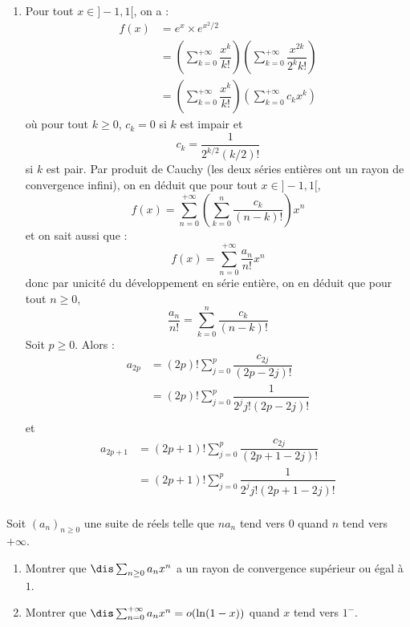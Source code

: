 \documentclass[a4paper,10pt]{report}
\begin{document}
\begin{enumerate}
\item Pour tout $x \in ]-1,1[$, on a :
\begin{align*}
f(x) & = e^x \times e^{x^2/2} \\
& = \left( \sum_{k=0}^{+ \infty} \dfrac{x^k}{k!} \right) \left( \sum_{k=0}^{+ \infty} \dfrac{x^{2k}}{2^k k!} \right)  \\
& = \left( \sum_{k=0}^{+ \infty} \dfrac{x^k}{k!} \right) \left( \sum_{k=0}^{+ \infty} c_k x^k \right)  
\end{align*}
où pour tout $k \geq 0$, $c_k=0$ si $k$ est impair et 
$$ c_k = \dfrac{1}{2^{k/2} (k/2)!}$$
si $k$ est pair. Par produit de Cauchy (les deux séries entières ont un rayon de convergence infini), on en déduit que pour tout $x \in ]-1,1[$,
$$ f(x) = \sum_{n=0}^{+ \infty} \left(\sum_{k=0}^n \dfrac{c_k}{(n-k)!} \right) x^n$$
et on sait aussi que :
$$ f(x) = \sum_{n=0}^{+ \infty} \dfrac{a_n}{n!} x^n$$
donc par unicité du développement en série entière, on en déduit que pour tout $n \geq 0$,
$$\dfrac{a_n}{n!} = \sum_{k=0}^n \dfrac{c_k}{(n-k)!}$$
Soit $p \geq 0$. Alors :
\begin{align*}
a_{2p} & = (2p)! \sum_{j=0}^p \dfrac{c_{2j}}{(2p-2j)!} \\
& = (2p)! \sum_{j=0}^p \dfrac{1}{2^j j! (2p-2j)!} \\
\end{align*}
et 
\begin{align*}
a_{2p+1} & = (2p+1)! \sum_{j=0}^p \dfrac{c_{2j}}{(2p+1-2j)!} \\
& = (2p+1)! \sum_{j=0}^p \dfrac{1}{2^j j! (2p+1-2j)!} \\
\end{align*}
\end{enumerate}

\begin{Exercice}{} Soit $(a_n)_{n \geq 0}$ une suite de réels telle que $na_n$ tend vers $0$ quand $n$ tend vers $+ \infty$.
\begin{enumerate}
\item Montrer que $\dis \sum_{n \geq 0} a_n x^n$ a un rayon de convergence supérieur ou égal à $1$.
\item Montrer que $\dis \sum_{n=0}^{+ \infty} a_n x^n = o(\ln(1-x))$ quand $x$ tend vers $1^{-}$.
\end{enumerate}
\end{Exercice}
\end{document}
